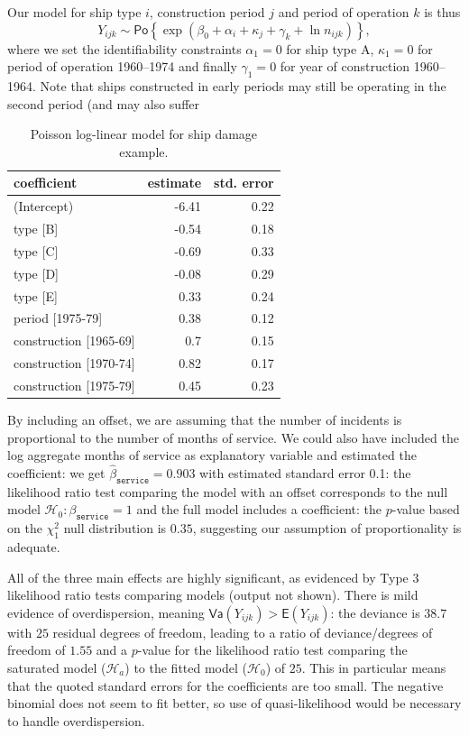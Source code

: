 \documentclass[
  11pt,
  letterpaper,
]{book}
\theoremstyle{definition}
\theoremstyle{definition}
\theoremstyle{definition}
\theoremstyle{definition}
\theoremstyle{remark}
\begin{document}
Our model for ship type \(i\), construction period \(j\) and period of operation \(k\) is thus
\[Y_{ijk} \sim \mathsf{Po}\left\{\exp\left(\beta_0 + \alpha_i+\kappa_j + \gamma_k + \ln n_{ijk}\right)\right\},\]
where we set the identifiability constraints \(\alpha_1=0\) for ship type A, \(\kappa_1=0\) for period of operation 1960--1974 and finally \(\gamma_1=0\) for year of construction 1960--1964. Note that ships constructed in early periods may still be operating in the second period (and may also suffer

\begin{table}

\caption{\label{tab:shipsoffset}Poisson log-linear model for ship damage example.}
\centering
\begin{tabular}[t]{lrr}
\toprule
coefficient & estimate & std. error\\
\midrule
(Intercept) & -6.41 & 0.22\\
type [B] & -0.54 & 0.18\\
type [C] & -0.69 & 0.33\\
type [D] & -0.08 & 0.29\\
type [E] & 0.33 & 0.24\\
\addlinespace
period [1975-79] & 0.38 & 0.12\\
construction [1965-69] & 0.7 & 0.15\\
construction [1970-74] & 0.82 & 0.17\\
construction [1975-79] & 0.45 & 0.23\\
\bottomrule
\end{tabular}
\end{table}

By including an offset, we are assuming that the number of incidents is proportional to the number of months of service. We could also have included the log aggregate months of service as explanatory variable and estimated the coefficient: we get \(\widehat{\beta}_{\texttt{service}}=0.903\) with estimated standard error 0.1: the likelihood ratio test comparing the model with an offset corresponds to the null model \(\mathscr{H}_0: \beta_{\texttt{service}}=1\) and the full model includes a coefficient: the \(p\)-value based on the \(\chi^2_1\) null distribution is \(0.35\), suggesting our assumption of proportionality is adequate.

All of the three main effects are highly significant, as evidenced by Type 3 likelihood ratio tests comparing models (output not shown). There is mild evidence of overdispersion, meaning \(\mathsf{Va}(Y_{ijk}) > \mathsf{E}(Y_{ijk})\): the deviance is \(38.7\) with \(25\) residual degrees of freedom, leading to a ratio of deviance/degrees of freedom of \(1.55\) and a \(p\)-value for the likelihood ratio test comparing the saturated model (\(\mathscr{H}_a\)) to the fitted model (\(\mathscr{H}_0\)) of \(25\). This in particular means that the quoted standard errors for the coefficients are too small. The negative binomial does not seem to fit better, so use of quasi-likelihood would be necessary to handle overdispersion.
\end{document}

